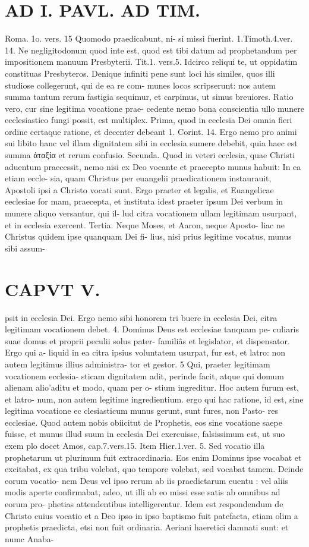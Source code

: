 \documentclass{article}
\begin{document}
\begin{pages}
\section*{AD I. PAVL. AD TIM. }
\marginpar{[ p.46 ]}Roma. 1o. vers. 15 Quomodo praedicabunt, ni- si missi fuerint. 1.Timoth.4.ver. 14. Ne negligitodonum quod inte est, quod est tibi datum ad prophetandum per impositionem manuum Presbyterii. Tit.1. vers.5. Idcirco reliqui te, ut oppidatim constituas Presbyteros. Denique infiniti pene sunt loci his similes, quos illi studiose collegerunt, qui de ea re com- munes locos scripserunt: nos autem summa tantum rerum fastigia sequimur, et carpimus, ut simus breuiores. Ratio vero, cur sine legitima vocatione prae- cedente nemo bona conscientia ullo munere ecclesiastico fungi possit, est multiplex. Prima, quod in ecclesia Dei omnia fieri ordine certaque ratione, et decenter debeant 1. Corint. 14. Ergo nemo pro animi sui libito hanc vel illam dignitatem sibi in ecclesia sumere debebit, quia haec est summa ἀταξία et rerum confusio. Secunda. Quod in veteri ecclesia, quae Christi aduentum praecessit, nemo nisi ex Deo vocante et praecepto munus habuit: In ea etiam eccle- sia, quam Christus per euangelii praedicationem instaurauit, Apostoli ipsi a Christo vocati sunt. Ergo praeter et legalis, et Euangelicae eeclesiae for mam, praecepta, et instituta idest praeter ipsum Dei verbum in munere aliquo versantur, qui il- lud citra vocationem ullam legitimam usurpant, et in ecclesia exercent. Tertia. Neque Moses, et Aaron, neque Aposto- liac ne Christus quidem ipse quanquam Dei fi- lius, nisi prius legitime vocatus, munus sibi assum- 
\section*{CAPVT V. }
\marginpar{[ p.343 ]}psit in ecclesia Dei. Ergo nemo sibi honorem tri buere in ecclesia Dei, citra legitimam vocationem debet. 4. Dominus Deus est ecclesiae tanquam pe- culiaris suae domus et proprii peculii solus pater- familiâs et legislator, et dispensator. Ergo qui a- liquid in ea citra ipsius voluntatem usurpat, fur est, et latro: non autem legitimus illius administra- tor et gestor. 5 Qui, praeter legitimam vocationem ecclesia- sticam dignitatem adit, perinde facit, atque qui domum alienam alio’aditu et modo, quam per o- stium ingreditur. Hoc autem furum est, et latro- num, non autem legitime ingredientium. ergo qui hac ratione, id est, sine legitima vocatione ec clesiasticum munus gerunt, sunt fures, non Pasto- res ecclesiae. Quod autem nobis obiicitut de Prophetis, eos sine vocatione saepe fuisse, et munus illud suum in ecclesia Dei exercuisse, falsissimum est, ut suo exem plo docet Amos, cap.7.vers.15. Item Hier.1.ver. 5. Sed vocatio illa prophetarum ut plurimum fuit extraordinaria. Eos enim Dominus ipse vocabat et excitabat, ex qua tribu volebat, quo tempore volebat, sed vocabat tamem. Deinde eorum vocatio- nem Deus vel ipso rerum ab iis praedictarum euentu : vel aliis modis aperte confirmabat, adeo, ut illi ab eo missi esse satis ab omnibus ad eorum pro- phetias attendentibus intelligerentur. Idem est respondendum de Christo cuius vocatio et a Deo ipso in ipso baptismo fuit patefacta, etiam olim a prophetis praedicta, etsi non fuit ordinaria. Aeriani haeretici damnati sunt: et numc Anaba- 

\end{pages}
\end{document}
